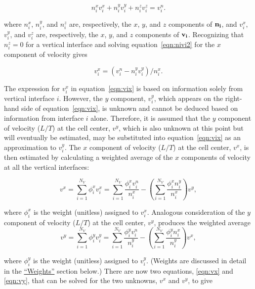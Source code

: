 \begin{equation}
\label{eqn:nivi2}
n_i^x v_i^x + n_i^y v_i^y + n_i^z v_i^z = v_i^n.
\end{equation}

\noindent where $n_i^x$, $n_i^y$, and $n_i^z$ are, respectively, the $x$, $y$, and $z$ components of $\mathbf{n_i}$, and $v_i^x$, $v_i^y$, and $v_i^z$ are, respectively, the $x$, $y$, and $z$ components of $\mathbf{v_i}$. Recognizing that $n_i^z = 0$  for a vertical interface and solving equation~\ref{eqn:nivi2} for the $x$ component of velocity gives

\begin{equation}
\label{eqn:vix}
v_i^x = \left ( v_i^n - n_i^y v_i^y \right ) / n_i^x.
\end{equation}

\noindent The expression for $v_i^x$ in equation~\ref{eqn:vix} is based on information solely from vertical interface $i$. However, the $y$ component, $v_i^y$, which appears on the right-hand side of equation~\ref{eqn:vix}, is unknown and cannot be deduced based on information from interface $i$ alone. Therefore, it is assumed that the $y$ component of velocity ($L/T$) at the cell center, $v^y$, which is also unknown at this point but will eventually be estimated, may be substituted into equation~\ref{eqn:vix} as an approximation to $v_i^y$. The $x$ component of velocity ($L/T$) at the cell center, $v^x$, is then estimated by calculating a weighted average of the $x$ components of velocity at all the vertical interfaces:

\begin{equation}
\label{eqn:vx}
v^x = \sum_{i=1}^{N_V} \phi_i^x v_i^x = \sum_{i=1}^{N_V} \frac{\phi_i^x v_i^n}{n_i^x} - \left( \sum_{i=1}^{N_V} \frac{\phi_i^x n_i^y}{n_i^x}  \right ) v^y,
\end{equation}

\noindent where $\phi_i^x$ is the weight (unitless) assigned to $v_i^x$. Analogous consideration of the $y$ component of velocity ($L/T$) at the cell center, $v^y$, produces the weighted average
\begin{equation}
\label{eqn:vy}
v^y = \sum_{i=1}^{N_V} \phi_i^y v_i^y = \sum_{i=1}^{N_V} \frac{\phi_i^y v_i^n}{n_i^y} - \left( \sum_{i=1}^{N_V} \frac{\phi_i^y n_i^x}{n_i^y}  \right ) v^x,
\end{equation}

\noindent where $\phi_i^y$ is the weight (unitless) assigned to $v_i^y$. (Weights are discussed in detail in the \hyperref[sec:weights]{``Weights''} section below.) There are now two equations, \ref{eqn:vx} and \ref{eqn:vy}, that can be solved for the two unknowns, $v^x$ and $v^y$, to give

